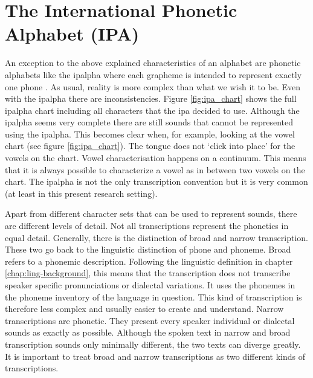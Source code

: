 \section{The International Phonetic Alphabet (IPA)}
\label{sec:ipa}
An exception to the above explained characteristics of an alphabet are phonetic alphabets like the \ac{ipalpha} where each grapheme is intended to represent exactly one phone  \citep{writing-systems, Intro.2007}. As usual, reality is more complex than what we wish it to be. Even with the \ac{ipalpha} there are inconsistencies. Figure \ref{fig:ipa_chart} shows the full \ac{ipalpha} chart including all characters that the \ac{ipa} decided to use. Although the \ac{ipalpha} seems very complete there are still sounds that cannot be represented using the \ac{ipalpha}. This becomes clear when, for example, looking at the vowel chart (see figure \ref{fig:ipa_chart}). The tongue does not `click into place' for the vowels on the chart. Vowel characterisation happens on a continuum. This means that it is always possible to characterize a vowel as in between two vowels on the chart. The \ac{ipalpha} is not the only transcription convention but it is very common (at least in this present research setting). 

Apart from different character sets that can be used to represent sounds, there are different levels of detail. Not all transcriptions represent the phonetics in equal detail. Generally, there is the distinction of broad and narrow transcription. These two go back to the linguistic distinction of phone and phoneme. Broad refers to a phonemic description. Following the linguistic definition in chapter \ref{chap:ling-background}, this means that the transcription does not transcribe speaker specific pronunciations or dialectal variations. It uses the phonemes in the phoneme inventory of the language in question. This kind of transcription is therefore less complex and usually easier to create and understand. Narrow transcriptions are phonetic. They present every speaker individual or dialectal sounds as exactly as possible. Although the spoken text in narrow and broad transcription sounds only minimally different, the two texts can diverge greatly. It is important to treat broad and narrow transcriptions as two different kinds of transcriptions. 

\begin{covexamples}
\item \label{exBro} 
\item \label{exNar}
\end{covexamples}

